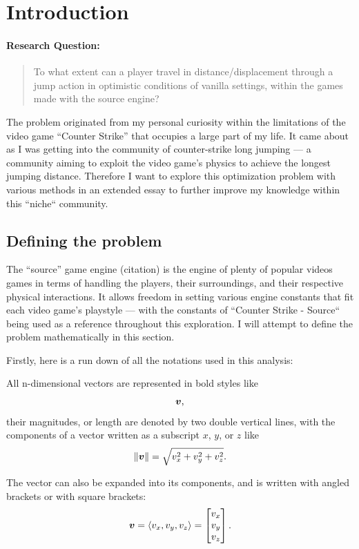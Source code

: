 \section{Introduction}

\paragraph{Research Question:}
\begin{quote}
    To what extent can a player travel in distance/displacement through a jump action in optimistic conditions of vanilla settings, within the games made with the source engine?
\end{quote}

The problem originated from my personal curiosity within the limitations of the video game ``Counter Strike'' that occupies a large part of my life. It came about as I was getting into the community of counter-strike long jumping --- a community aiming to exploit the video game's physics to achieve the longest jumping distance. Therefore I want to explore this optimization problem with various methods in an extended essay to further improve my knowledge within this ``niche`` community.

\subsection{Defining the problem}
The ``source'' game engine (citation) is the engine of plenty of popular videos games in terms of handling the players, their surroundings, and their respective physical interactions. It allows freedom in setting various engine constants that fit each video game's playstyle --- with the constants of ``Counter Strike - Source`` being used as a reference throughout this exploration. I will attempt to define the problem mathematically in this section.

Firstly, here is a run down of all the notations used in this analysis:

All n-dimensional vectors are represented in bold styles like
\[
\boldsymbol{v},
\]
their magnitudes, or length are denoted by two double vertical lines, with the components of a vector written as a subscript $x$, $y$, or $z$ like
\[
\|\boldsymbol{v}\| = \sqrt{v_x^2 + v_y^2 + v_z^2}.
\]

The vector can also be expanded into its components, and is written with angled brackets or with square brackets:
\[
\boldsymbol{v} = \left\langle v_x, v_y, v_z \right\rangle = \begin{bmatrix} v_x\\v_y\\v_z \end{bmatrix}.
\]

